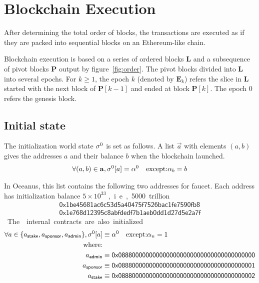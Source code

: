

\section{Blockchain Execution}

After determining the total order of blocks, the transactions are executed as if they are packed into sequential blocks on an Ethereum-like chain. 

Blockchain execution is based on a series of ordered blocks $\mathbf{L}$ and a subsequence of pivot blocks $\mathbf{P}$ output by figure~\ref{fig:order}. 
%
The pivot blocks divided into $\mathbf{L}$ into several epochs.  For $k\ge 1$, the epoch $k$ (denoted by $\mathbf{E}_k$) refers the slice in $\mathbf{L}$ started with the next block of $\mathbf{P}[k-1]$ and ended at block $\mathbf{P}[k]$. The epoch 0 refers the genesis block. 


\subsection{Initial state}

The initialization world state $\mathbf{\sigma}^0$ is set as follows. A list $\vec{a}$ with elements $(a,b)$ gives the addresses $a$ and their balance $b$ when the \name blockchain launched.  
\begin{align}
	\forall (a,b)\in \mathbf{a}, \mathbf{\sigma}^0[a]= \mathbf{\alpha}^0 \quad \mbox{except:} \mathbf{\alpha}_b=b 
\end{align}

In Oceanus, this list contains the following two addresses for faucet. Each address has initialization balance $5\times 10^{33}$ \unit, i.e., 5000 trillion \coinsign.
%
\begin{align*}
	\mathsf{0x1be45681ac6c53d5a40475f7526bac1fe7590fb8} \\
	\mathsf{0x1e768d12395c8abfdedf7b1aeb0dd1d27d5e2a7f}
\end{align*}

The \name internal contracts are also initialized.
%
\begin{align}
	\forall a\in \{a_{\sf stake},a_{\sf sponsor},a_{\sf admin}\}, \mathbf{\sigma}^0[a] &\equiv \mathbf{\alpha}^0 \quad \mbox{except:} \mathbf{\alpha}_n=1 \\
	\mbox{where:}&\\
	a_{\sf admin} &\equiv {\sf 0x0888000000000000000000000000000000000000} \\ 
	a_{\sf sponsor} &\equiv {\sf 0x0888000000000000000000000000000000000001} \\
	a_{\sf stake} &\equiv {\sf 0x0888000000000000000000000000000000000002}
\end{align}

